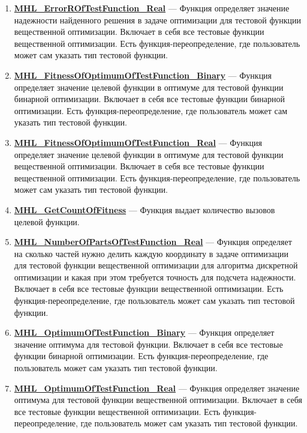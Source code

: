\documentclass[a4paper,12pt]{article}
\begin{document}
\begin{enumerate}
\item \textbf{\hyperref[MHL_ErrorROfTestFunction_Real]{MHL\_ErrorROfTestFunction\_Real}} --- Функция определяет значение надежности найденного решения в задаче оптимизации для тестовой функции вещественной оптимизации. Включает в себя все тестовые функции  вещественной оптимизации. Есть функция-переопределение, где пользователь может сам указать тип тестовой функции.

\item \textbf{\hyperref[MHL_FitnessOfOptimumOfTestFunction_Binary]{MHL\_FitnessOfOptimumOfTestFunction\_Binary}} --- Функция определяет значение целевой функции в оптимуме для тестовой функции бинарной оптимизации. Включает в себя все тестовые функции бинарной оптимизации. Есть функция-переопределение, где пользователь может сам указать тип тестовой функции.

\item \textbf{\hyperref[MHL_FitnessOfOptimumOfTestFunction_Real]{MHL\_FitnessOfOptimumOfTestFunction\_Real}} --- Функция определяет значение целевой функции в оптимуме для тестовой функции вещественной оптимизации. Включает в себя все тестовые функции вещественной оптимизации. Есть функция-переопределение, где пользователь может сам указать тип тестовой функции.

\item \textbf{\hyperref[MHL_GetCountOfFitness]{MHL\_GetCountOfFitness}} --- Функция выдает количество вызовов целевой функции.

\item \textbf{\hyperref[MHL_NumberOfPartsOfTestFunction_Real]{MHL\_NumberOfPartsOfTestFunction\_Real}} --- Функция определяет на сколько частей нужно делить каждую координату в задаче оптимизации для тестовой функции вещественной оптимизации для алгоритма дискретной оптимизации и какая при этом требуется точность для подсчета надежности. Включает в себя все тестовые функции вещественной оптимизации. Есть функция-переопределение, где пользователь может сам указать тип тестовой функции.

\item \textbf{\hyperref[MHL_OptimumOfTestFunction_Binary]{MHL\_OptimumOfTestFunction\_Binary}} --- Функция определяет значение оптимума для тестовой функции. Включает в себя все тестовые функции бинарной оптимизации. Есть функция-переопределение, где пользователь может сам указать тип тестовой функции.

\item \textbf{\hyperref[MHL_OptimumOfTestFunction_Real]{MHL\_OptimumOfTestFunction\_Real}} --- Функция определяет значение оптимума для тестовой функции вещественной оптимизации. Включает в себя все тестовые функции вещественной оптимизации. Есть функция-переопределение, где пользователь может сам указать тип тестовой функции.


\end{enumerate}
\end{document}
